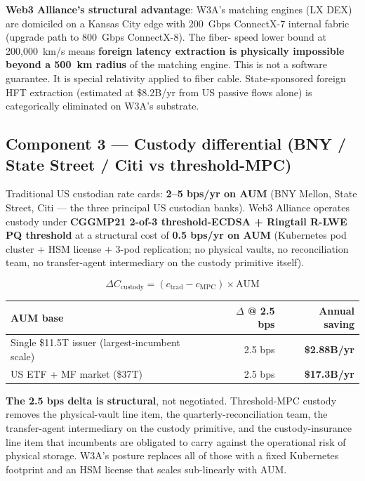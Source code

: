 \textbf{Web3 Alliance's structural advantage}: W3A's matching engines
(LX DEX) are domiciled on a Kansas City edge with 200~Gbps ConnectX-7
internal fabric (upgrade path to 800~Gbps ConnectX-8). The fiber-
speed lower bound at 200,000~km/s means \textbf{foreign latency
extraction is physically impossible beyond a 500~km radius} of the
matching engine. This is not a software guarantee. It is special
relativity applied to fiber cable. State-sponsored foreign HFT
extraction (estimated at \$8.2B/yr from US passive flows alone) is
categorically eliminated on W3A's substrate.

\subsection{Component 3 --- Custody differential (BNY / State Street / Citi vs threshold-MPC)}

Traditional US custodian rate cards: \textbf{2--5 bps/yr on AUM}
(BNY Mellon, State Street, Citi --- the three principal US custodian
banks). Web3 Alliance operates custody under \textbf{CGGMP21 2-of-3
threshold-ECDSA + Ringtail R-LWE PQ threshold} at a structural cost of
\textbf{0.5 bps/yr on AUM} (Kubernetes pod cluster + HSM license +
3-pod replication; no physical vaults, no reconciliation team, no
transfer-agent intermediary on the custody primitive itself).

\[
\Delta C_{\text{custody}} = (c_{\text{trad}} - c_{\text{MPC}}) \times \text{AUM}
\]

\begin{center}
\small
\begin{tabular}{lrr}
\toprule
AUM base & $\Delta$ @ 2.5 bps & Annual saving \\
\midrule
Single \$11.5T issuer (largest-incumbent scale) & 2.5 bps & \textbf{\$2.88B/yr} \\
US ETF + MF market (\$37T) & 2.5 bps & \textbf{\$17.3B/yr} \\
\bottomrule
\end{tabular}
\end{center}

\textbf{The 2.5 bps delta is structural}, not negotiated.
Threshold-MPC custody removes the physical-vault line item, the
quarterly-reconciliation team, the transfer-agent intermediary on the
custody primitive, and the custody-insurance line item that incumbents
are obligated to carry against the operational risk of physical
storage. W3A's posture replaces all of those with a fixed Kubernetes
footprint and an HSM license that scales sub-linearly with AUM.

